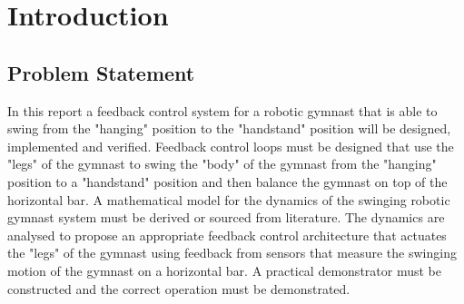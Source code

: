 \chapter{Introduction}
\label{chp:introduction}


\section{Problem Statement}

In this report a feedback control system for a robotic gymnast that is able to swing from the "hanging" position to the "handstand" position will be designed, implemented and verified. Feedback control loops must be designed that use the "legs" of the gymnast to swing the "body" of the gymnast from the "hanging" position to a "handstand" position and then balance the gymnast on top of the horizontal bar. A mathematical model for the dynamics of the swinging robotic gymnast system must be derived or sourced from literature. The dynamics are analysed to propose an appropriate feedback control architecture that actuates the "legs" of the gymnast using feedback from sensors that measure the swinging motion of the gymnast on a horizontal bar. A practical demonstrator must be constructed and the correct operation must be demonstrated.\\

